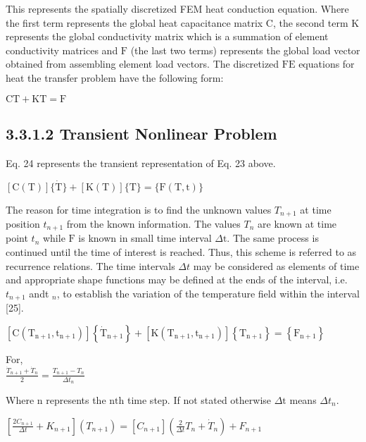 \documentclass[10pt]{article}
\begin{document}
This represents the spatially discretized FEM heat conduction equation. Where the first term represents the global heat capacitance matrix $\mathrm{C}$, the second term $\mathrm{K}$ represents the global conductivity matrix which is a summation of element conductivity matrices and $\mathrm{F}$ (the last two terms) represents the global load vector obtained from assembling element load vectors. The discretized $\mathrm{FE}$ equations for heat the transfer problem have the following form:

$\mathrm{CT}+\mathrm{KT}=\mathrm{F}$

\subsection*{3.3.1.2 Transient Nonlinear Problem}
Eq. 24 represents the transient representation of Eq. 23 above.

$[\mathrm{C}(\mathrm{T})]\{\dot{\mathrm{T}}\}+[\mathrm{K}(\mathrm{T})]\{\mathrm{T}\}=\{\mathrm{F}(\mathrm{T}, \mathrm{t})\}$

The reason for time integration is to find the unknown values $T_{n+1}$ at time position $t_{n+1}$ from the known information. The values $T_{n}$ are known at time point $t_{n}$ while $\mathrm{F}$ is known in small time interval $\Delta \mathrm{t}$. The same process is continued until the time of interest is reached. Thus, this scheme is referred to as recurrence relations. The time intervals $\Delta t$ may be considered as elements of time and appropriate shape functions may be defined at the ends of the interval, i.e. $t_{n+1}$ andt $_{n}$, to establish the variation of the temperature field within the interval [25].

$\left[\mathrm{C}\left(\mathrm{T}_{\mathrm{n}+1}, \mathrm{t}_{\mathrm{n}+1}\right)\right]\left\{\dot{\mathrm{T}}_{\mathrm{n}+1}\right\}+\left[\mathrm{K}\left(\mathrm{T}_{\mathrm{n}+1}, \mathrm{t}_{\mathrm{n}+1}\right)\right]\left\{\mathrm{T}_{\mathrm{n}+1}\right\}=\left\{\mathrm{F}_{\mathrm{n}+1}\right\}$

For,\\
$\frac{\dot{T}_{n+1}+\dot{T}_{n}}{2}=\frac{T_{n+1}-T_{n}}{\Delta t_{n}}$

Where $\mathrm{n}$ represents the $\mathrm{nth}$ time step. If not stated otherwise $\Delta \mathrm{t}$ means $\Delta t_{n}$.

$\left[\frac{2 C_{n+1}}{\Delta t}+K_{n+1}\right]\left(T_{n+1}\right)=\left[C_{n+1}\right]\left(\frac{2}{\Delta t} T_{n}+\dot{T}_{n}\right)+F_{n+1}$
\end{document}
